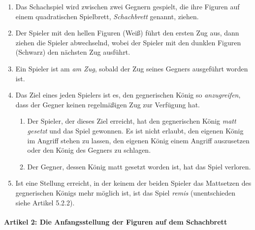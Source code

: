 \documentclass[
  a4paper,
  justified,
  nobib,
]{tufte-handout}
\begin{document}
\begin{enumerate}[{1}.1]
  \item Das Schachspiel wird zwischen zwei Gegnern gespielt, die ihre Figuren auf einem
    quadratischen Spielbrett, \emph{Schachbrett} genannt, ziehen.
  \item Der Spieler mit den hellen Figuren (Weiß) führt den ersten Zug aus, dann ziehen
    die Spieler abwechselnd, wobei der Spieler mit den dunklen Figuren (Schwarz) den
    nächsten Zug ausführt.
  \item Ein Spieler ist am \emph{am Zug}, sobald der Zug seines Gegners ausgeführt worden
    ist.
  \item Das Ziel eines jeden Spielers ist es, den gegnerischen König so
    \emph{anzugreifen}, dass der Gegner keinen regelmäßigen Zug zur Verfügung hat.
    \begin{enumerate}[{1.4}.1]
      \item Der Spieler, der dieses Ziel erreicht, hat den gegnerischen König \emph{matt
        gesetzt} und das Spiel gewonnen. Es ist nicht erlaubt, den eigenen König im Angriff
        stehen zu lassen, den eigenen König einem Angriff auszusetzen oder den König des
        Gegners zu schlagen.
      \item Der Gegner, dessen König matt gesetzt worden ist, hat das Spiel verloren.
    \end{enumerate}
  \item Ist eine Stellung erreicht, in der keinem der beiden Spieler das Mattsetzen des
    gegnerischen Königs mehr möglich ist, ist das Spiel \emph{remis}
    (unentschieden siehe Artikel 5.2.2).
\end{enumerate}

\paragraph{Artikel 2: Die Anfangsstellung der Figuren auf dem Schachbrett}%
\end{document}
